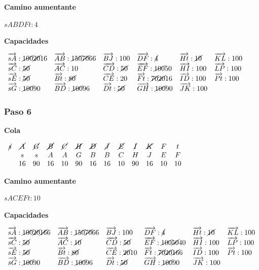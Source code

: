\documentclass[10pt,a4paper]{article}
\begin{document}
\textbf{Camino aumentante}

$sABDFt:4$

\textbf{Capacidades}

$\begin{array}{llllll} \overrightarrow{sA}: \cancel{100}\cancel{20}16& \overrightarrow{AB}: \cancel{150} \cancel{70}66&\overrightarrow{BJ}: 100&\overrightarrow{DF}: \cancel{4}&\overrightarrow{Ht}: \cancel{10}&\overrightarrow{KL}: 100\\ \overrightarrow{sC}: \cancel{50}& \overrightarrow{AC}: 10&\overrightarrow{CD}: \cancel{50}&\overrightarrow{EF}: \cancel{100}50&\overrightarrow{HI}: 100&\overrightarrow{LP}: 100\\ \overrightarrow{sE}: \cancel{50}& \overrightarrow{Bt}: \cancel{80}&\overrightarrow{CE}: 20&\overrightarrow{Ft}: \cancel{70}\cancel{20}16&\overrightarrow{ID}: 100&\overrightarrow{Pt}: 100\\ \overrightarrow{sG}: \cancel{100}90& \overrightarrow{BD}: \cancel{100}96&\overrightarrow{Dt}: \cancel{50}&\overrightarrow{GH}: \cancel{100}90&\overrightarrow{JK}: 100&\\ \end{array}$

\subsubsection*{Paso 6}

\textbf{Cola}

$\begin{array}{cccccccccccccc} \cancel{s} & \cancel{A} & \cancel{G} & \cancel{B} & \cancel{C} & \cancel{H} & \cancel{D} & \cancel{J} & \cancel{E} & \cancel{I} & \cancel{K} & F& t\\ & s & s & A & A & G & B &B & C & H & J & E &F\\ & 16 & 90 & 16 & 10 & 90&16& 16 & 10 & 90 & 16 & 10 &10 \end{array}$

\textbf{Camino aumentante}

$sACEFt:10$

\textbf{Capacidades}

$\begin{array}{llllll} \overrightarrow{sA}: \cancel{100}\cancel{20}\cancel{16}6& \overrightarrow{AB}: \cancel{150} \cancel{70}66&\overrightarrow{BJ}: 100&\overrightarrow{DF}: \cancel{4}&\overrightarrow{Ht}: \cancel{10}&\overrightarrow{KL}: 100\\ \overrightarrow{sC}: \cancel{50}& \overrightarrow{AC}: \cancel{10}&\overrightarrow{CD}: \cancel{50}&\overrightarrow{EF}: \cancel{100}\cancel{50}40&\overrightarrow{HI}: 100&\overrightarrow{LP}: 100\\ \overrightarrow{sE}: \cancel{50}& \overrightarrow{Bt}: \cancel{80}&\overrightarrow{CE}: \cancel{20}10 &\overrightarrow{Ft}: \cancel{70}\cancel{20}\cancel{16}6&\overrightarrow{ID}: 100&\overrightarrow{Pt}: 100\\ \overrightarrow{sG}: \cancel{100}90& \overrightarrow{BD}: \cancel{100}96&\overrightarrow{Dt}: \cancel{50}&\overrightarrow{GH}: \cancel{100}90&\overrightarrow{JK}: 100&\\ \end{array}$
\end{document}
